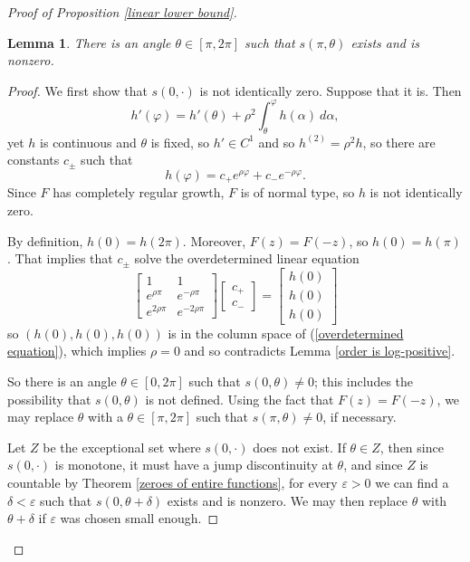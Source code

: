 \documentclass[reqno,12pt,letterpaper]{amsart}
\newtheorem{lemma}[theorem]{Lemma}
\theoremstyle{definition}
\begin{document}
\begin{proof}[Proof of Proposition \ref{linear lower bound}]
\begin{lemma}
\label{linear angle exists}
There is an angle $\theta \in [\pi, 2\pi]$ such that $s(\pi, \theta)$ exists and is nonzero.
\end{lemma}
\begin{proof}
We first show that $s(0, \cdot)$ is not identically zero. Suppose that it is. Then
\begin{equation}
\label{h is C^2}
h'(\varphi) = h'(\theta) + \rho^2 \int_\theta^\varphi h(\alpha) ~d\alpha,
\end{equation}
yet $h$ is continuous \cite[Chapter I, \S16]{levin1964distribution} and $\theta$ is fixed, so $h' \in C^1$ and so $h^{(2)} = \rho^2 h$,
so there are constants $c_\pm$ such that
$$h(\varphi) = c_+e^{\rho\varphi} + c_-e^{-\rho\varphi}.$$
Since $F$ has completely regular growth, $F$ is of normal type, so $h$ is not identically zero.

By definition, $h(0) = h(2\pi)$. Moreover, $F(z) = F(-z)$, so $h(0) = h(\pi)$. That implies that $c_\pm$ solve the overdetermined linear equation
\begin{equation}
\label{overdetermined equation}
\begin{bmatrix}1 & 1\\
e^{\rho\pi} & e^{-\rho\pi}\\
e^{2\rho\pi} & e^{-2\rho\pi}
\end{bmatrix}\begin{bmatrix}c_+\\c_-\end{bmatrix} =
\begin{bmatrix}
h(0)\\h(0) \\h(0)
\end{bmatrix}
\end{equation}
so $(h(0), h(0), h(0))$ is in the column space of (\ref{overdetermined equation}), which implies $\rho = 0$ and so contradicts Lemma \ref{order is log-positive}.

So there is an angle $\theta \in [0, 2\pi]$ such that $s(0, \theta) \neq 0$; this includes the possibility that $s(0, \theta)$ is not defined.
Using the fact that $F(z) = F(-z)$, we may replace $\theta$ with a $\theta \in [\pi, 2\pi]$ such that $s(\pi, \theta) \neq 0$, if necessary.

Let $Z$ be the exceptional set where $s(0, \cdot)$ does not exist.
If $\theta \in Z$, then since $s(0, \cdot)$ is monotone, it must have a jump discontinuity at $\theta$, and since $Z$ is countable by Theorem \ref{zeroes of entire functions}, for every $\varepsilon > 0$ we can find a $\delta < \varepsilon$ such that $s(0, \theta + \delta)$ exists and is nonzero.
We may then replace $\theta$ with $\theta + \delta$ if $\varepsilon$ was chosen small enough.
\end{proof}


\end{proof}
\end{document}
